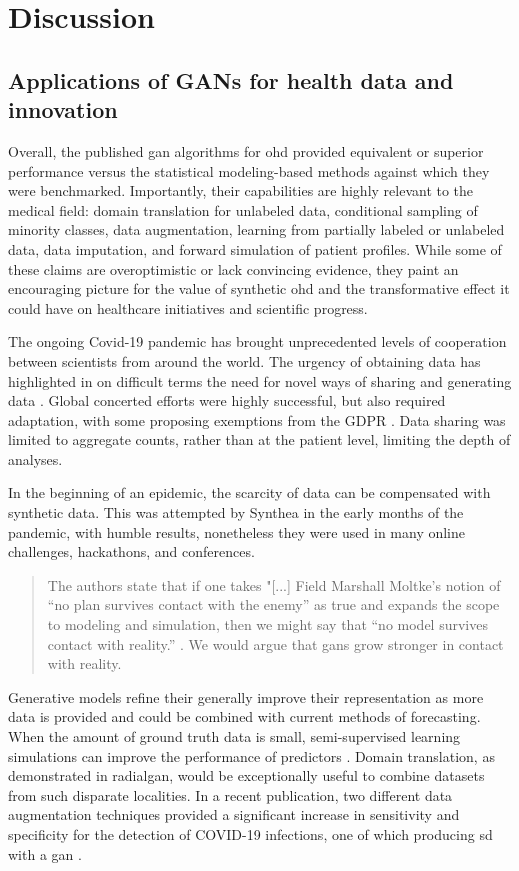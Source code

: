 \section{Discussion}


\subsection{Applications of GANs for health data and innovation}

Overall, the published \gls{gan} algorithms for \gls{ohd} provided equivalent or superior performance versus the statistical modeling-based methods against which they were benchmarked. Importantly, their capabilities are highly relevant to the medical field: domain translation for unlabeled data, conditional sampling of minority classes, data augmentation, learning from partially labeled or unlabeled data, data imputation, and forward simulation of patient profiles. While some of these claims are overoptimistic or lack convincing evidence, they paint an encouraging picture for the value of synthetic \gls{ohd} and the transformative effect it could have on healthcare initiatives and scientific progress.\par

The ongoing Covid-19 pandemic has brought unprecedented levels of cooperation between scientists from around the world. The urgency of obtaining data has highlighted in on difficult terms the need for novel ways of sharing and generating data \cite{bandara_improving_2020, Cosgriff_2020}. Global concerted efforts were highly successful, but also required adaptation, with some proposing exemptions from the GDPR \cite{mclennan_covid-19_2020}. Data sharing was limited to aggregate counts, rather than at the patient level, limiting the depth of analyses. \par

In the beginning of an epidemic, the scarcity of data can be compensated with synthetic data. This was attempted by Synthea \cite{Walonoski_2017} in the early months of the pandemic, with humble results, nonetheless they were used in many online challenges, hackathons, and conferences. 
\begin{quote}
    The authors state that if one takes "[...] Field Marshall Moltke’s notion of “no plan survives contact with the enemy” as true and expands the scope to modeling and simulation, then we might say that “no model survives contact with reality.” \cite{walonoski_synthea_2020}. We would argue that \glspl{gan} grow stronger in contact with reality. 
\end{quote}
Generative models refine their generally improve their representation as more data is provided and could be combined with current methods of forecasting. When the amount of ground truth data is small, semi-supervised learning simulations can improve the performance of predictors \cite{dahmen_synsys_2019}. Domain translation, as demonstrated in \gls{radialgan}, would be exceptionally useful to combine datasets from such disparate localities. In a recent publication, two different data augmentation techniques provided a significant increase in sensitivity and specificity for the detection of COVID-19 infections, one of which producing \gls{sd} with a \gls{gan} \cite{Sedik2020-tx}.

